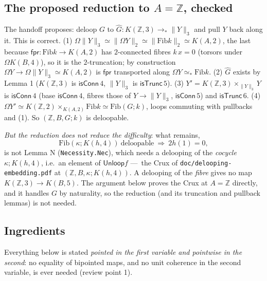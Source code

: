 \documentclass[11pt]{amsart}
\theoremstyle{definition}
\theoremstyle{remark}
\newcommand{\Om}{\Omega}
\newcommand{\code}[1]{\texttt{#1}}
\newcommand{\cT}{\mathsf{isTrunc}}
\newcommand{\cC}{\mathsf{isConn}}
\newcommand{\Fib}{\mathrm{Fib}}
\newcommand{\fpr}{\mathsf{fpr}}
\newcommand{\tr}[1]{\|#1\|}
\newcommand{\Unloop}{\mathsf{Unloop}}
\newcommand{\pteq}{\simeq_*}
\newcommand{\Z}{\mathbb{Z}}
\begin{document}
\subsection{The proposed reduction to $A=\Z$, checked}
The handoff proposes: deloop $G$ to $\hat G:K(\Z,3)\to_*\tr Y_3$ and pull $Y$
back along it. This is correct. (1) $\Om\tr Y_3\simeq\tr{\Om Y}_2\simeq
\tr{\Fib k}_2\simeq K(A,2)$, the last because $\fpr:\Fib k\to K(A,2)$ has
$2$-connected fibres $k\,x=0$ (torsors under $\Om K(B,4)$), so it is the
$2$-truncation; by construction $\Om Y\to\Om\tr Y_3\simeq K(A,2)$ is $\fpr$
transported along $\Om Y\pteq\Fib k$. (2) $\hat G$ exists by Lemma 1
($K(\Z,3)$ is $\cC\,4$, $\tr Y_3$ is $\cT\,5$). (3) $Y'=K(\Z,3)\times_{\tr Y_3}Y$
is $\cC\,4$ (base $\cC\,4$, fibres those of $Y\to\tr Y_3$, $\cC\,5$) and $\cT\,6$.
(4) $\Om Y'\simeq K(\Z,2)\times_{K(A,2)}\Fib k\simeq\Fib(G;k)$, loops commuting
with pullbacks and (1). So $(\Z,B,G;k)$ is deloopable.

\emph{But the reduction does not reduce the difficulty}: what remains,
\[
  \Fib(\kappa;K(h,4))\ \text{deloopable}\ \Longrightarrow\ 2h(1)=0,
\]
is not Lemma N (\code{Necessity.Nec}), which needs a delooping of the
\emph{cocycle} $\kappa;K(h,4)$, i.e.\ an element of $\Unloop f$ ---~the Crux of
\code{doc/delooping-embedding.pdf} at $(\Z,B,\kappa;K(h,4))$. A delooping of the
\emph{fibre} gives no map $K(\Z,3)\to K(B,5)$. The argument below proves the
Crux at $A=\Z$ directly, and it handles $G$ by naturality, so the reduction (and
its truncation and pullback lemmas) is not needed.

\subsection{Ingredients}
Everything below is stated \emph{pointed in the first variable and pointwise
in the second}: no equality of bipointed maps, and no unit coherence in the
second variable, is ever needed (review point 1).
\end{document}
